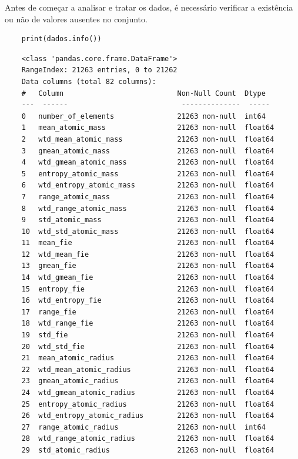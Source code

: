 Antes de começar a analisar e tratar os dados, é necessário verificar a existência ou não de valores ausentes no conjunto.
\begin{longlisting}
    \begin{verbatim}
    print(dados.info())
    \end{verbatim}
\end{longlisting}
\begin{verbatim}
    <class 'pandas.core.frame.DataFrame'>
    RangeIndex: 21263 entries, 0 to 21262
    Data columns (total 82 columns):
    #   Column                           Non-Null Count  Dtype  
    ---  ------                           --------------  -----  
    0   number_of_elements               21263 non-null  int64  
    1   mean_atomic_mass                 21263 non-null  float64
    2   wtd_mean_atomic_mass             21263 non-null  float64
    3   gmean_atomic_mass                21263 non-null  float64
    4   wtd_gmean_atomic_mass            21263 non-null  float64
    5   entropy_atomic_mass              21263 non-null  float64
    6   wtd_entropy_atomic_mass          21263 non-null  float64
    7   range_atomic_mass                21263 non-null  float64
    8   wtd_range_atomic_mass            21263 non-null  float64
    9   std_atomic_mass                  21263 non-null  float64
    10  wtd_std_atomic_mass              21263 non-null  float64
    11  mean_fie                         21263 non-null  float64
    12  wtd_mean_fie                     21263 non-null  float64
    13  gmean_fie                        21263 non-null  float64
    14  wtd_gmean_fie                    21263 non-null  float64
    15  entropy_fie                      21263 non-null  float64
    16  wtd_entropy_fie                  21263 non-null  float64
    17  range_fie                        21263 non-null  float64
    18  wtd_range_fie                    21263 non-null  float64
    19  std_fie                          21263 non-null  float64
    20  wtd_std_fie                      21263 non-null  float64
    21  mean_atomic_radius               21263 non-null  float64
    22  wtd_mean_atomic_radius           21263 non-null  float64
    23  gmean_atomic_radius              21263 non-null  float64
    24  wtd_gmean_atomic_radius          21263 non-null  float64
    25  entropy_atomic_radius            21263 non-null  float64
    26  wtd_entropy_atomic_radius        21263 non-null  float64
    27  range_atomic_radius              21263 non-null  int64  
    28  wtd_range_atomic_radius          21263 non-null  float64
    29  std_atomic_radius                21263 non-null  float64

\end{verbatim}
